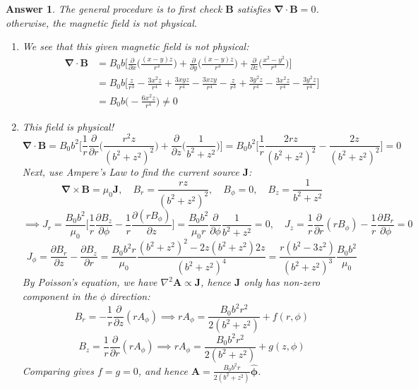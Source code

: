 \documentclass[a4paper]{article}
\newtheorem{ans}{Answer}[section]
\theoremstyle{new}
\begin{document}
\begin{ans}
The general procedure is to first check $\mathbf{B}$ satisfies $\boldsymbol{\nabla}\cdot\mathbf{B}=0$. otherwise, the magnetic field is not physical.
\begin{enumerate}[label=(\alph*)]
\item We see that this given magnetic field is not physical: 
\begin{align}
    \boldsymbol{\nabla}\cdot\mathbf{B}&=B_0b\bigg[\frac{\partial}{\partial x}\bigg(\frac{(x-y)z}{r^3}\bigg)+\frac{\partial}{\partial y}\bigg(\frac{(x-y)z}{r^3}\bigg)+\frac{\partial}{\partial z}\bigg(\frac{x^2-y^2}{r^3}\bigg)\bigg]\nonumber\\&=B_0b\bigg[\frac{z}{r^3}-\frac{3x^2z}{r^4}+\frac{3xyz}{r^4}-\frac{3xzy}{r^4}-\frac{z}{r^3}+\frac{3y^2z}{r^4}-\frac{3x^2z}{r^4}-\frac{3y^2z}{r^4}\bigg]\nonumber\\&=B_0b\bigg(-\frac{6x^2z}{r^4}\bigg)\neq 0\nonumber
\end{align}
\item This field is physical!
$$\boldsymbol{\nabla}\cdot\mathbf{B}=B_0b^2\bigg[\frac{1}{r}\frac{\partial}{\partial r}\bigg(\frac{r^2z}{(b^2+z^2)^2}\bigg)+\frac{\partial}{\partial z}\bigg(\frac{1}{b^2+z^2}\bigg)\bigg]=B_0b^2\bigg[\frac{1}{r}\frac{2rz}{(b^2+z^2)^2}-\frac{2z}{(b^2+z^2)^2}\bigg]=0$$
Next, use Ampere's Law to find the current source $\mathbf{J}$:
$$\boldsymbol{\nabla}\times\mathbf{B}=\mu_0\mathbf{J},\quad B_r=\frac{rz}{(b^2+z^2)^2},\quad B_\phi=0,\quad B_z=\frac{1}{b^2+z^2}$$
$$\implies J_r=\frac{B_0b^2}{\mu_0}\bigg[\frac{1}{r}\frac{\partial B_z}{\partial\phi}-\frac{1}{r}\frac{\partial(rB_\phi)}{\partial z}\bigg]=\frac{B_0b^2}{\mu_0r}\frac{\partial}{\partial\phi}\frac{1}{b^2+z^2}=0,\quad J_z=\frac{1}{r}\frac{\partial}{\partial r}(rB_\phi)-\frac{1}{r}\frac{\partial B_r}{\partial\phi}=0$$
$$J_\phi=\frac{\partial B_r}{\partial z}-\frac{\partial B_z}{\partial r}=\frac{B_0b^2r}{\mu_0}\frac{(b^2+z^2)^2-2z(b^2+z^2)2z}{(b^2+z^2)^4}=\frac{r(b^2-3z^2)}{(b^2+z^2)^3}\frac{B_0b^2}{\mu_0}$$
By Poisson's equation, we have $\nabla^2\mathbf{A}\propto\mathbf{J}$, hence $\mathbf{J}$ only has non-zero component in the $\phi$ direction:
$$B_r=-\frac{1}{r}\frac{\partial}{\partial z}(rA_\phi)\implies rA_\phi=\frac{B_0b^2r^2}{2(b^2+z^2)}+f(r,\phi)$$
$$B_z=\frac{1}{r}\frac{\partial}{\partial r}(rA_\phi)\implies rA_\phi=\frac{B_0b^2r^2}{2(b^2+z^2)}+g(z,\phi)$$
Comparing gives $f=g=0$, and hence $\mathbf{A}=\frac{B_0b^2r}{2(b^2+z^2)}\boldsymbol{\hat{\phi}}$.
\end{enumerate}
\end{ans}
\end{document}
